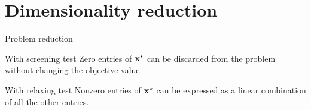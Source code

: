 \documentclass[10pt]{beamer}
\newcommand{\emphone}[1]{{\color{orange}#1}}
\begin{document}


\section{Dimensionality reduction}

\begin{frame}{Problem reduction}
  \begin{alertblock}{With screening test}
    \emphone{Zero} entries of $\mathbf{x}^{\star}$ can be \emphone{discarded} from the problem without changing the objective value.
  \end{alertblock}
  \vspace{1.5cm}

  \pause

  \begin{alertblock}{With relaxing test}
    \emphone{Nonzero} entries of $\mathbf{x}^{\star}$ can be expressed as a \emphone{linear combination} of all the other entries.
  \end{alertblock}
\end{frame}
\end{document}

